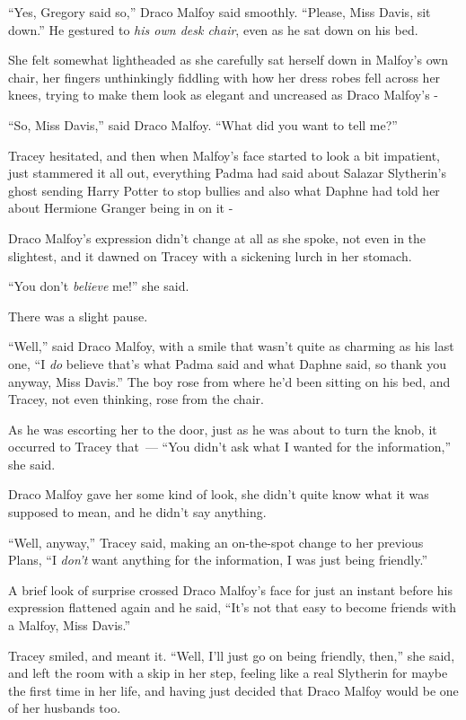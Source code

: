 ``Yes, Gregory said so,'' Draco Malfoy said smoothly. ``Please, Miss Davis, sit down.'' He gestured to \emph{his own desk chair}, even as he sat down on his bed.

She felt somewhat lightheaded as she carefully sat herself down in Malfoy's own chair, her fingers unthinkingly fiddling with how her dress robes fell across her knees, trying to make them look as elegant and uncreased as Draco Malfoy's -

``So, Miss Davis,'' said Draco Malfoy. ``What did you want to tell me?''

Tracey hesitated, and then when Malfoy's face started to look a bit impatient, just stammered it all out, everything Padma had said about Salazar Slytherin's ghost sending Harry Potter to stop bullies and also what Daphne had told her about Hermione Granger being in on it -

Draco Malfoy's expression didn't change at all as she spoke, not even in the slightest, and it dawned on Tracey with a sickening lurch in her stomach.

``You don't \emph{believe} me!'' she said.

There was a slight pause.

``Well,'' said Draco Malfoy, with a smile that wasn't quite as charming as his last one, ``I \emph{do} believe that's what Padma said and what Daphne said, so thank you anyway, Miss Davis.'' The boy rose from where he'd been sitting on his bed, and Tracey, not even thinking, rose from the chair.

As he was escorting her to the door, just as he was about to turn the knob, it occurred to Tracey that~--- ``You didn't ask what I wanted for the information,'' she said.

Draco Malfoy gave her some kind of look, she didn't quite know what it was supposed to mean, and he didn't say anything.

``Well, anyway,'' Tracey said, making an on-the-spot change to her previous Plans, ``I \emph{don't} want anything for the information, I was just being friendly.''

A brief look of surprise crossed Draco Malfoy's face for just an instant before his expression flattened again and he said, ``It's not that easy to become friends with a Malfoy, Miss Davis.''

Tracey smiled, and meant it. ``Well, I'll just go on being friendly, then,'' she said, and left the room with a skip in her step, feeling like a real Slytherin for maybe the first time in her life, and having just decided that Draco Malfoy would be one of her husbands too.

